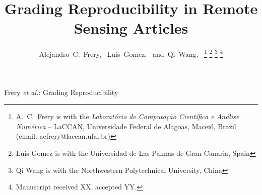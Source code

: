 \documentclass[journal]{IEEEtran}
\begin{document}
	
	\title{Grading Reproducibility in Remote Sensing Articles}
	
	\author{Alejandro~C.~Frery,~
		Luis~Gomez,~
		and~Qi~Wang,~%
		\thanks{A.\ C.\ Frery is with the \textit{Laborat\'orio de Computa\c c\~ao Cient\'ifica e An\'alise Num\'erica} -- LaCCAN, Universidade Federal de Alagoas, Macei\'o, Brazil (email: acfrery@laccan.ufal.br)}%
		\thanks{Luis Gomez is with the Universidad de Las Palmas de Gran Canaria, Spain}%
		\thanks{Qi Wang is with the Northwestern Polytechnical University, China}%
		\thanks{Manuscript received XX, accepted YY.}}
	
	
	
	
	{Frery \MakeLowercase{\textit{et al.}}: Grading Reproducibility}
	
\end{document}
